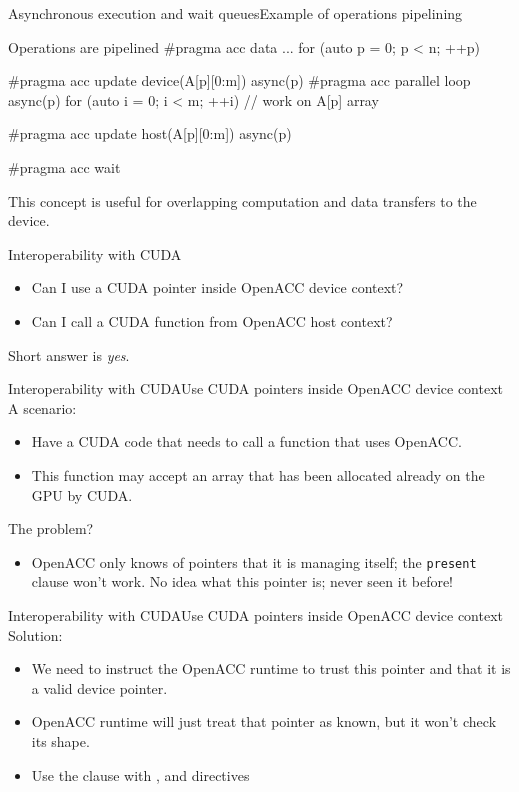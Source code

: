 \documentclass[12pt,aspectratio=169]{beamer}
\begin{document}
\begin{frame}[fragile]{Asynchronous execution and wait queues}{Example of operations pipelining}
  \begin{Cpplisting}{Operations are pipelined}
#pragma acc data ...
for (auto p = 0; p < n; ++p) {
    #pragma acc update device(A[p][0:m]) async(p)
    #pragma acc parallel loop async(p)
    for (auto i = 0; i < m; ++i) {
        // work on A[p] array
    }

    #pragma acc update host(A[p][0:m]) async(p)
}
#pragma acc wait
  \end{Cpplisting}
  \vfill
  This concept is useful for overlapping computation and data transfers to the device.
\end{frame}

\begin{frame}{Interoperability with CUDA}
  \large
  \begin{itemize}
  \item Can I use a CUDA pointer inside OpenACC device context?
    \vspace\baselineskip
  \item Can I call a CUDA function from OpenACC host context?
  \end{itemize}
  \vfill
  Short answer is \emph{yes}.
\end{frame}

\begin{frame}{Interoperability with CUDA}{Use CUDA pointers inside OpenACC device context}
  A scenario:
  \begin{itemize}
  \item Have a CUDA code that needs to call a function that uses OpenACC.
  \item This function may accept an array that has been allocated already on the GPU by CUDA.
  \end{itemize}
  \vfill
  The problem?
  \begin{itemize}
  \item OpenACC only knows of pointers that it is managing itself; the \texttt{present} clause won't work. No idea what this pointer is; never seen it before!
  \end{itemize}
\end{frame}

\begin{frame}{Interoperability with CUDA}{Use CUDA pointers inside OpenACC device context}
  Solution:
  \vspace\baselineskip
  \begin{itemize}
  \item We need to instruct the OpenACC runtime to trust this pointer and that it is a valid device pointer.
  \item OpenACC runtime will just treat that pointer as known, but it won't check its shape.
  \item Use the  clause with
    ,  and  directives
  \end{itemize}
\end{frame}
\end{document}
